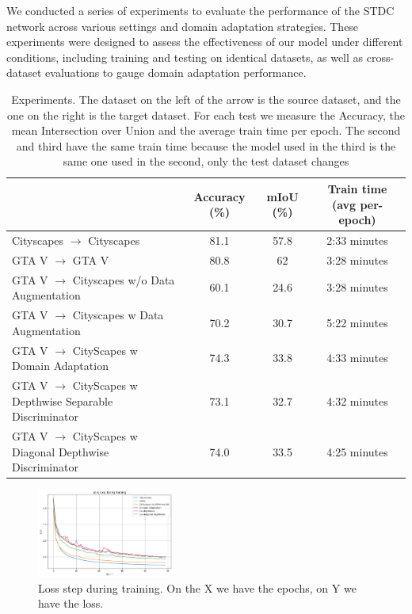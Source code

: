 \documentclass[conference]{IEEEtran}
\begin{document}
We conducted a series of experiments to evaluate the performance of the STDC network across various settings and domain adaptation strategies. These experiments were designed to assess the effectiveness of our model under different conditions, including training and testing on identical datasets, as well as cross-dataset evaluations to gauge domain adaptation performance.

\begin{table}[]
\centering
\caption{Experiments. The dataset on the left of the arrow is the source dataset, and the one on the right is the target dataset. For each test we measure the Accuracy, the mean Intersection over Union and the average train time per epoch. The second and third have the same train time because the model used in the third is the same one used in the second, only the test dataset changes}
\label{TrainingTimeAndAccuracy}
\begin{tabularx}{\textwidth}{@{}Xccc@{}}
\toprule
& Accuracy (\%) & mIoU (\%) & Train time (avg per-epoch) \\ \midrule
Cityscapes $\rightarrow$ Cityscapes & 81.1 & 57.8 & 2:33 minutes \\
GTA V $\rightarrow$ GTA V & 80.8 & 62 & 3:28 minutes \\
GTA V $\rightarrow$ Cityscapes w/o Data Augmentation & 60.1 & 24.6 & 3:28 minutes \\
GTA V $\rightarrow$ Cityscapes w Data Augmentation & 70.2 & 30.7 & 5:22 minutes \\
GTA V $\rightarrow$ CityScapes w Domain Adaptation & 74.3 & 33.8 & 4:33 minutes \\
GTA V $\rightarrow$ CityScapes w Depthwise Separable Discriminator & 73.1 & 32.7 & 4:32 minutes \\
GTA V $\rightarrow$ CityScapes w Diagonal Depthwise Discriminator & 74.0 & 33.5 & 4:25 minutes \\
\bottomrule
\end{tabularx}
\end{table}


\begin{figure}[tp]
\centerline{\includegraphics[width=0.4\textwidth]{figures/loss}}
\caption{Loss step during training. On the X we have the epochs, on Y we have the loss.}
\label{fig:loss_steps}
\end{figure}
\end{document}

